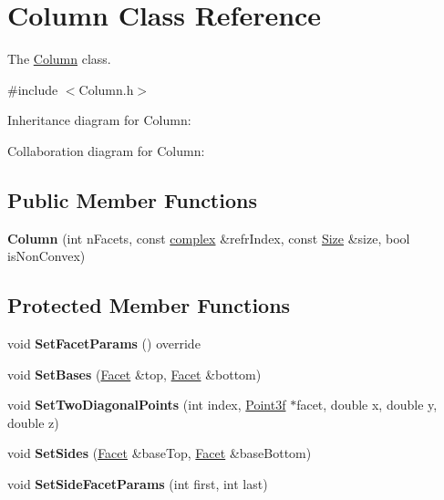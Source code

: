 \hypertarget{class_column}{}\section{Column Class Reference}
\label{class_column}


The \mbox{\hyperlink{class_column}{Column}} class.  




{\ttfamily \#include $<$Column.\+h$>$}



Inheritance diagram for Column\+:


Collaboration diagram for Column\+:
\subsection*{Public Member Functions}
\begin{DoxyCompactItemize}
\item 
\mbox{\label{class_column_a7eaee92cd3aed5562652242037e8a58c}} 
{\bfseries Column} (int n\+Facets, const \mbox{\hyperlink{classcomplex}{complex}} \&refr\+Index, const \mbox{\hyperlink{struct_size}{Size}} \&size, bool is\+Non\+Convex)
\end{DoxyCompactItemize}
\subsection*{Protected Member Functions}
\begin{DoxyCompactItemize}
\item 
\mbox{\label{class_column_a6c1b221d3b77b84dc327080bdc832dc8}} 
void {\bfseries Set\+Facet\+Params} () override
\item 
\mbox{\label{class_column_af9e69ceebb96af7c4968e51cdcf7f01a}} 
void {\bfseries Set\+Bases} (\mbox{\hyperlink{class_facet}{Facet}} \&top, \mbox{\hyperlink{class_facet}{Facet}} \&bottom)
\item 
\mbox{\label{class_column_ac0558dde864e35ac694a4463a0cadb99}} 
void {\bfseries Set\+Two\+Diagonal\+Points} (int index, \mbox{\hyperlink{struct_point3f}{Point3f}} $\ast$facet, double x, double y, double z)
\item 
\mbox{\label{class_column_aa12a30383a19d408f4d57b9aa2b348a2}} 
void {\bfseries Set\+Sides} (\mbox{\hyperlink{class_facet}{Facet}} \&base\+Top, \mbox{\hyperlink{class_facet}{Facet}} \&base\+Bottom)
\item 
\mbox{\label{class_column_aaff3281532436d6c70c0eaca569665d8}} 
void {\bfseries Set\+Side\+Facet\+Params} (int first, int last)
\end{DoxyCompactItemize}
